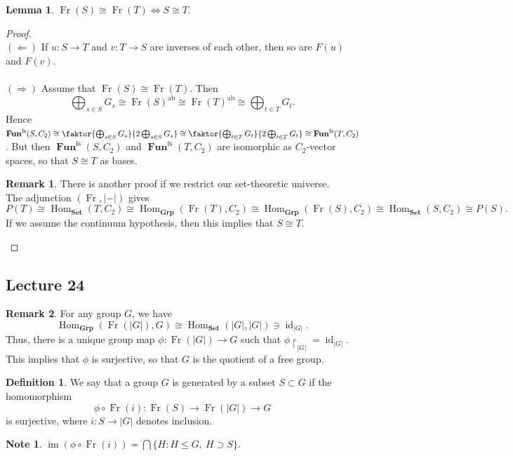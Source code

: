 \documentclass[10pt,letterpaper,cm]{nupset}
\theoremstyle{definition}
\newtheorem*{definition}{Definition}
\newtheorem{note}{Note}
\newtheorem{remark}{Remark}
\newtheorem{lemma}{Lemma}
\newcommand{\1}{\mathbf{1}}
\newcommand{\0}{\vec 0}
\DeclareMathOperator{\id}{id}
\DeclareMathOperator{\ab}{ab}
\DeclareMathOperator{\im}{im}
\DeclareMathOperator{\fs}{fs}
\DeclareMathOperator{\Hom}{Hom}
\DeclareMathOperator{\Fun}{\mathbf{Fun}}
\DeclareMathOperator{\Fr}{Fr}
\begin{document}
\begin{lemma}
$\Fr(S) \cong \Fr(T) \iff S\cong T.$ 
\end{lemma}
\begin{proof} $ $
\\ $(\Longleftarrow)$ If $u: S \to T$ and $v: T\to S$ are inverses of each other, then so are $F(u)$ and $F(v)$.
\\ \\
$(\Longrightarrow)$ Assume that $\Fr(S) \cong \Fr(T)$. Then $$\bigoplus_{s\in S} G_s \cong \Fr(S)^{\ab} \cong \Fr(T)^{\ab} \cong \bigoplus_{t\in T} G_t.$$ Hence $\Fun^{\fs}(S, C_2)\cong \faktor{\bigoplus_{s\in S} G_s}{2\bigoplus_{s\in S} G_s} \cong \faktor{\bigoplus_{t\in T} G_t}{2\bigoplus_{t\in T} G_t}\cong \Fun^{\fs}(T, C_2)$. But then $\Fun^{\fs}(S, C_2)$ and  $\Fun^{\fs}(T, C_2)$ are isomorphic as $C_2$-vector spaces, so that $S \cong T$ as bases. 
\begin{remark} There is another proof if we restrict our set-theoretic universe.
\\
The adjunction $(\Fr, \lvert - \rvert)$ gives $$P(T) \cong \Hom_{\mathbf{Set}}(T, C_2) \cong \Hom_{\mathbf{Grp}}(\Fr(T), C_2)\cong \Hom_{\mathbf{Grp}}(\Fr(S), C_2)\cong \Hom_{\mathbf{Set}}(S, C_2)\cong P(S).$$
If we assume the continuum hypothesis, then this implies that $S \cong T$.
\end{remark}
\end{proof}

\subsection{Lecture 24}

\begin{remark}
For any group $G$, we have $$\Hom_{\mathbf{Grp}}(\Fr(|G|), G) \cong \Hom_{\mathbf{Set}}(|G|, |G|)\ni \id_{|G|}.$$ Thus, there is a unique group map $\phi : \Fr(|G|) \to G$ such that $\phi \restriction_{|G|} = \id_{|G|}$. This implies that $\phi$ is surjective, so that $G$ is the quotient of a free group.
\end{remark}

\begin{definition}
We say that a group $G$ is generated by a subset $S\subset G$ if the homomorphism $$\phi \circ \Fr(i):\Fr(S) \to \Fr(|G|) \to G$$ is surjective, where $i: S \to |G|$ denotes inclusion.
\end{definition}

\begin{note}
$\im(\phi \circ \Fr(i)) = \bigcap \{H : H \leq G, \ H \supset S\}$.
\end{note}
\end{document}
